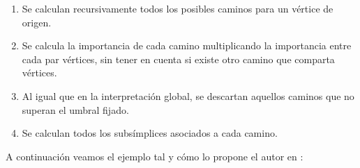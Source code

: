 \documentclass[12pt, a4paper, twoside]{book}
\numberwithin{equation}{section}
\theoremstyle{definition}
\theoremstyle{remark}
\theoremstyle{plain}
\begin{document}
	\begin{enumerate}[label=\arabic*)]
		\item Se calculan recursivamente todos los posibles caminos 
			para un vértice de origen. 
		\item Se calcula la importancia de cada camino multiplicando 
			la importancia entre cada par vértices, sin tener en 
			cuenta si existe otro camino que comparta vértices.
		\item Al igual que en la interpretación global, se descartan 
			aquellos caminos que no superan el umbral fijado. 

		\item Se calculan todos los subsímplices asociados a cada 
			camino.
	\end{enumerate}

	A continuación veamos el ejemplo tal y cómo lo propone el autor en 
	\cite{Articulo-Watanabe}:
	
\end{document}
